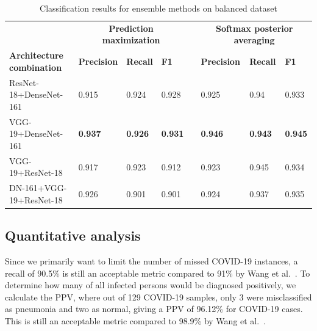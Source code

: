 \documentclass[conference]{IEEEtran}
\begin{document}
\begin{table}
    \centering
    \caption{Classification results for ensemble methods on balanced dataset}
	\label{Table:ensemble_result}
	\scriptsize{
	\begin{tabular}{p{4.3cm}p{1.6cm}p{1.1cm}p{0.8cm}p{0.1cm}p{1.6cm}p{1.1cm}p{0.8cm}}
		 &  \multicolumn{3}{c}{\textbf{Prediction maximization}} && \multicolumn{3}{c}{\textbf{Softmax posterior averaging}}  \\	
		\cmidrule{2-4}\cmidrule{6-8}
		\textbf{Architecture combination} &  \textbf{Precision} & \textbf{Recall}& \textbf{F1}&& \textbf{Precision} & \textbf{Recall}& \textbf{F1}\\
		\hline
		ResNet-18+DenseNet-161 & 0.915 & 0.924 & 0.928 && 0.925 & 0.94 & 0.933\\
		VGG-19+DenseNet-161 & \textbf{0.937} & \textbf{0.926} & \textbf{0.931} && \textbf{0.946} & \textbf{0.943} & \textbf{0.945}\\
		VGG-19+ResNet-18 & 0.917 & 0.923 & 0.912 &&  0.923 & 0.945 & 0.934\\
		DN-161+VGG-19+ResNet-18 & 0.926 & 0.901 & 0.901 && 0.924 & 0.937 & 0.935\\
		\hline 
	\end{tabular}}
	\vspace{-2mm}
\end{table}

\subsection{Quantitative analysis}
Since we primarily want to limit the number of missed COVID-19 instances, a recall of 90.5\% is still an acceptable metric compared to 91\% by Wang et al.~\cite{wang2020covid}.
To determine how many of all infected persons would be diagnosed positively, we calculate the PPV, where out of 129 COVID-19 samples, only 3 were misclassified as pneumonia and two as normal, giving a PPV of 96.12\% for COVID-19 cases. This is still an acceptable metric compared to 98.9\% by Wang et al.~\cite{wang2020covid}. 
\end{document}
